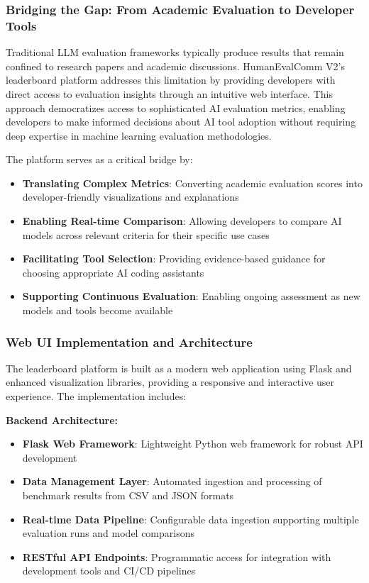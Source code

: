 \documentclass[conference]{IEEEtran}
\begin{document}
\subsubsection{Bridging the Gap: From Academic Evaluation to Developer Tools}

Traditional LLM evaluation frameworks typically produce results that remain confined to research papers and academic discussions. HumanEvalComm V2's leaderboard platform addresses this limitation by providing developers with direct access to evaluation insights through an intuitive web interface. This approach democratizes access to sophisticated AI evaluation metrics, enabling developers to make informed decisions about AI tool adoption without requiring deep expertise in machine learning evaluation methodologies.

The platform serves as a critical bridge by:
\begin{itemize}
    \item \textbf{Translating Complex Metrics}: Converting academic evaluation scores into developer-friendly visualizations and explanations
    \item \textbf{Enabling Real-time Comparison}: Allowing developers to compare AI models across relevant criteria for their specific use cases
    \item \textbf{Facilitating Tool Selection}: Providing evidence-based guidance for choosing appropriate AI coding assistants
    \item \textbf{Supporting Continuous Evaluation}: Enabling ongoing assessment as new models and tools become available
\end{itemize}

\subsubsection{Web UI Implementation and Architecture}

The leaderboard platform is built as a modern web application using Flask and enhanced visualization libraries, providing a responsive and interactive user experience. The implementation includes:

\textbf{Backend Architecture:}
\begin{itemize}
    \item \textbf{Flask Web Framework}: Lightweight Python web framework for robust API development
    \item \textbf{Data Management Layer}: Automated ingestion and processing of benchmark results from CSV and JSON formats
    \item \textbf{Real-time Data Pipeline}: Configurable data ingestion supporting multiple evaluation runs and model comparisons
    \item \textbf{RESTful API Endpoints}: Programmatic access for integration with development tools and CI/CD pipelines
\end{itemize}
\end{document}
